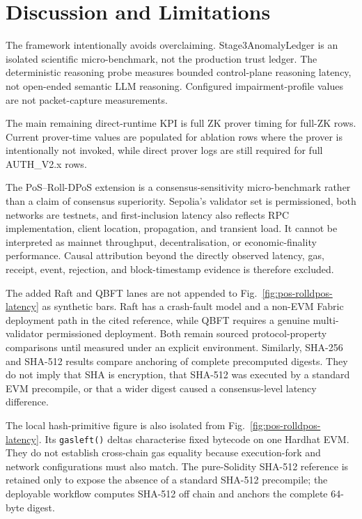 \section{Discussion and Limitations}
The framework intentionally avoids overclaiming. Stage3AnomalyLedger is an isolated scientific micro-benchmark, not the production trust ledger. The deterministic reasoning probe measures bounded control-plane reasoning latency, not open-ended semantic LLM reasoning. Configured impairment-profile values are not packet-capture measurements.

The main remaining direct-runtime KPI is full ZK prover timing for full-ZK rows. Current prover-time values are populated for ablation rows where the prover is intentionally not invoked, while direct prover logs are still required for full AUTH\_V2.x rows.

The PoS--Roll-DPoS extension is a consensus-sensitivity micro-benchmark rather than a claim of consensus superiority. Sepolia's validator set is permissioned, both networks are testnets, and first-inclusion latency also reflects RPC implementation, client location, propagation, and transient load. It cannot be interpreted as mainnet throughput, decentralisation, or economic-finality performance. Causal attribution beyond the directly observed latency, gas, receipt, event, rejection, and block-timestamp evidence is therefore excluded.

The added Raft and QBFT lanes are not appended to Fig.~\ref{fig:pos-rolldpos-latency}
as synthetic bars. Raft has a crash-fault model and a non-EVM Fabric deployment
path in the cited reference, while QBFT requires a genuine multi-validator
permissioned deployment. Both remain sourced protocol-property comparisons
until measured under an explicit environment. Similarly, SHA-256 and SHA-512
results compare anchoring of complete precomputed digests. They do not imply
that SHA is encryption, that SHA-512 was executed by a standard EVM precompile,
or that a wider digest caused a consensus-level latency difference.

The local hash-primitive figure is also isolated from Fig.~\ref{fig:pos-rolldpos-latency}.
Its \texttt{gasleft()} deltas characterise fixed bytecode on one Hardhat EVM.
They do not establish cross-chain gas equality because execution-fork and
network configurations must also match. The pure-Solidity SHA-512 reference is
retained only to expose the absence of a standard SHA-512 precompile; the
deployable workflow computes SHA-512 off chain and anchors the complete
64-byte digest.
